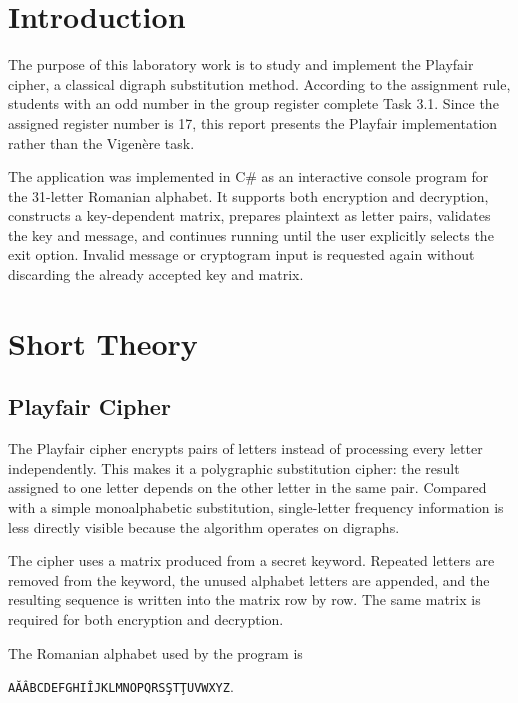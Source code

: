 \documentclass[12pt,a4paper]{article}
\begin{document}
\setcounter{page}{2}
\tableofcontents
\newpage

\section*{Introduction}

The purpose of this laboratory work is to study and implement the Playfair cipher, a classical digraph substitution method. According to the assignment rule, students with an odd number in the group register complete Task 3.1. Since the assigned register number is 17, this report presents the Playfair implementation rather than the Vigen\`ere task.

The application was implemented in C\# as an interactive console program for the 31-letter Romanian alphabet. It supports both encryption and decryption, constructs a key-dependent matrix, prepares plaintext as letter pairs, validates the key and message, and continues running until the user explicitly selects the exit option. Invalid message or cryptogram input is requested again without discarding the already accepted key and matrix.

\newpage
\section{Short Theory}

\subsection{Playfair Cipher}

The Playfair cipher encrypts pairs of letters instead of processing every letter independently. This makes it a polygraphic substitution cipher: the result assigned to one letter depends on the other letter in the same pair. Compared with a simple monoalphabetic substitution, single-letter frequency information is less directly visible because the algorithm operates on digraphs.

The cipher uses a matrix produced from a secret keyword. Repeated letters are removed from the keyword, the unused alphabet letters are appended, and the resulting sequence is written into the matrix row by row. The same matrix is required for both encryption and decryption.

The Romanian alphabet used by the program is

\begin{center}
  \small\texttt{A\u{A}\^{A}BCDEFGHI\^{I}JKLMNOPQRS\c{S}T\c{T}UVWXYZ}.
\end{center}
\end{document}
